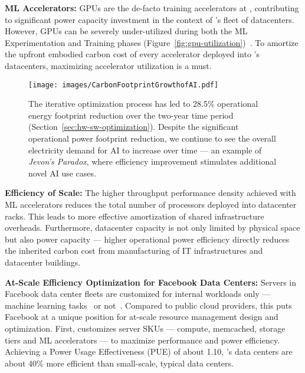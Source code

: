 \textbf{ML Accelerators:}
GPUs are the de-facto training accelerators at \fb, contributing to significant power capacity investment in the context of \fb's fleet of datacenters. However, GPUs can be severely under-utilized during both the ML Experimentation and Training phases (Figure~\ref{fig:gpu-utilization})~\cite{Wesolowski:ieee-micro:2021}. To amortize the upfront embodied carbon cost of every accelerator deployed into \fb’s datacenters, maximizing accelerator utilization is a must. 
\begin{figure}[t]
    \centering
    \texttt{[image: images/CarbonFootprintGrowthofAI.pdf]}
    \caption{The iterative optimization process has led to 28.5\% operational energy footprint reduction over the two-year time period (Section~\ref{sec:hw-sw-optimization}). Despite the significant operational power footprint reduction, we continue to see the overall electricity demand for AI to increase over time --- an example of \textit{Jevon's Paradox}, where efficiency improvement stimulates additional novel AI use cases.}
    \label{fig:jevon-paradox}
\end{figure}

\textbf{Efficiency of Scale:} The higher throughput performance density achieved with ML accelerators reduces the total number of processors deployed into datacenter racks. This leads to more effective amortization of shared infrastructure overheads. Furthermore, datacenter capacity is not only limited by physical space but also power capacity --- higher operational power efficiency directly reduces the inherited carbon cost from manufacturing of IT infrastructures and datacenter buildings. 


\textbf{At-Scale Efficiency Optimization for Facebook Data Centers:}
Servers in Facebook data center fleets are customized for internal workloads only --- machine learning tasks~\cite{Hazelwood:hpca:2018} or not~\cite{Sriraman:isca:2019,Sriraman:asplos:2020}. Compared to public cloud providers, this puts Facebook at a unique position for at-scale resource management design and optimization. First, \fb customizes server SKUs --- compute, memcached, storage tiers and ML accelerators --- to maximize performance and power efficiency. Achieving a Power Usage Effectiveness (PUE) of about 1.10, \fb's data centers are about 40\% more efficient than small-scale, typical data centers. 

